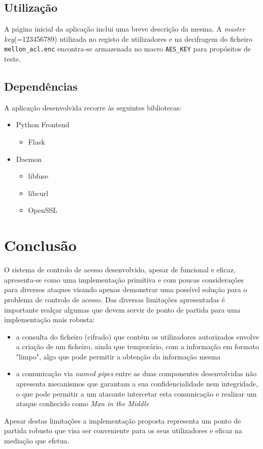 \documentclass{article}
\begin{document}
\subsection{Utilização}
A página inicial da aplicação inclui uma breve descrição da mesma.
A \textit{master key}(=123456789) utilizada no registo de utilizadores e na decifragem do ficheiro \texttt{mellon\_acl.enc} encontra-se
armazenada no macro \texttt{AES\_KEY} para propósitos de teste.

\subsection{Dependências}
A aplicação desenvolvida recorre às seguintes bibliotecas:
\begin{itemize}
    \item Python Frontend
    \begin{itemize}
        \item Flask
    \end{itemize}
    \item Daemon
    \begin{itemize}
        \item libfuse
        \item libcurl
        \item OpenSSL
    \end{itemize}
\end{itemize}

\section{Conclusão}
O sistema de controlo de acesso desenvolvido, apesar de funcional e eficaz, apresenta-se como uma implementação primitiva e 
com poucas considerações para diversos ataques visando apenas demonstrar uma possível solução para o problema de controlo de
acesso.
Das diversas limitações apresentadas é importante realçar algumas que devem servir de ponto de partida para uma implementação mais 
robusta: 
\begin{itemize}
    \item a consulta do ficheiro (cifrado) que contém os utilizadores autorizados envolve a criação de um ficheiro, ainda que temporário, 
    com a informação em formato "limpo", algo que pode permitir a obtenção da informação mesma
    \item a comunicação via \textit{named pipes} entre as duas componentes desenvolvidas não apresenta mecanismos que garantam a sua 
    confidencialidade nem integridade, o que pode permitir a um atacante intercetar esta comunicação e realizar um ataque conhecido como 
    \textit{Man in the Middle} 
\end{itemize}
Apesar destas limitações a implementação proposta representa um ponto de partida robusto que visa ser conveniente para os seus utilizadores
e eficaz na mediação que efetua.
\end{document}
